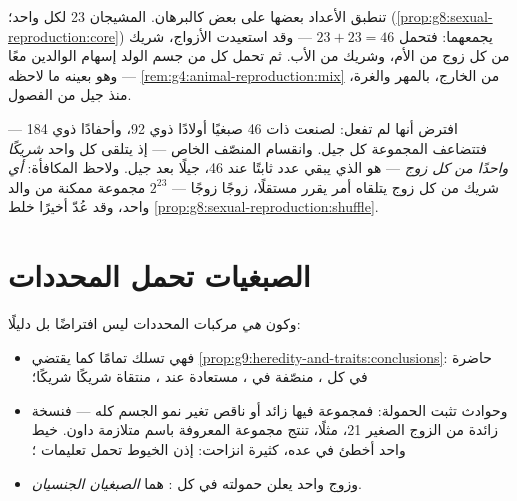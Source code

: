 \begin{example}\label{ex:g9:chromosomes:arithmetic}
تنطبق الأعداد بعضها على بعض كالبرهان. المشيجان 23 لكل
واحد؛ 
(\cref{prop:g8:sexual-reproduction:core}) يجمعهما:
فتحمل  $23 + 23 = 46$ --- وقد استعيدت الأزواج،
شريك من كل زوج من الأم، وشريك من الأب. ثم تحمل كل 
من  جسم الولد إسهام الوالدين معًا --- وهو بعينه ما
لاحظه \cref{rem:g4:animal-reproduction:mix} من الخارج،
بالمهر والغرة، منذ جيل من الفصول.
\end{example}

\begin{remark}\label{rem:g9:chromosomes:whyhalve}
افترض أنها لم تفعل: لصنعت  ذات 46 صبغيًا أولادًا
ذوي 92، وأحفادًا ذوي 184 --- فتتضاعف المجموعة كل جيل.
وانقسام  المنصّف الخاص --- إذ يتلقى كل واحد
\emph{شريكًا واحدًا من كل زوج} --- هو الذي يبقي عدد
 ثابتًا عند 46، جيلًا بعد جيل. ولاحظ المكافأة:
\emph{أي} شريك من كل زوج يتلقاه  أمر يقرر مستقلًا،
زوجًا زوجًا --- $2^{23}$ مجموعة ممكنة من والد واحد، وقد
عُدّ أخيرًا خلط
\cref{prop:g8:sexual-reproduction:shuffle}.
\end{remark}

\section{الصبغيات تحمل المحددات}

\begin{proposition}\label{prop:g9:chromosomes:evidence}
وكون  \emph{هي} مركبات المحددات ليس افتراضًا بل
دليلًا:
\begin{itemize}
  \item فهي تسلك تمامًا كما يقتضي
        \cref{prop:g9:heredity-and-traits:conclusions}:
        حاضرة في كل ، منصّفة في ، مستعادة عند
        ، منتقاة شريكًا شريكًا؛
  \item وحوادث  تثبت الحمولة: فمجموعة فيها
         زائد أو ناقص تغير نمو الجسم كله --- فنسخة
        زائدة من الزوج الصغير 21، مثلًا، تنتج مجموعة
         المعروفة باسم متلازمة داون. خيط واحد أخطئ
        في عده،  كثيرة انزاحت: إذن الخيوط تحمل
        تعليمات ؛
  \item وزوج واحد يعلن حمولته في كل : هما
        \emph{الصبغيان الجنسيان}.
\end{itemize}
\end{proposition}
\admitted

